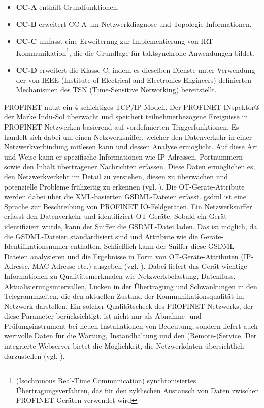 \begin{itemize}
\item \textbf{CC-A} enthält Grundfunktionen.
\item \textbf{CC-B} erweitert CC-A um Netzwerkdiagnose und Topologie-Informationen.
\item \textbf{CC-C} umfasst eine Erweiterung zur Implementierung von IRT-Kommunikation\footnote{(Isochronous Real-Time Communication) synchronisiertes Übertragungsverfahren, das für den zyklischen Austausch von Daten zwischen PROFINET-Geräten verwendet wird}, die die Grundlage für taktsynchrone Anwendungen bildet.
\item \textbf{CC-D} erweitert die Klasse C, indem es dieselben Dienste unter Verwendung der von IEEE (Institute of Electrical and Electronics Engineers) definierten Mechanismen des TSN (Time-Sensitive Networking) bereitstellt.
\end{itemize} PROFINET nutzt ein 4-schichtiges TCP/IP-Modell. Der PROFINET INspektor® der Marke Indu-Sol überwacht und speichert teilnehmerbezogene Ereignisse in PROFINET-Netzwerken basierend auf vordefinierten Triggerfunktionen. Es handelt sich dabei um einen Netzwerksniffer, welcher den Datenverkehr in einer Netzwerkverbindung mitlesen kann und dessen Analyse ermöglicht.  Auf diese Art und Weise kann er spezifische Informationen wie IP-Adressen, Portnummern sowie den Inhalt übertragener Nachrichten erfassen. Diese Daten ermöglichen es, den Netzwerkverkehr im Detail zu verstehen, diesen zu überwachen und potenzielle Probleme frühzeitig zu erkennen (vgl. \cite{luber}). Die OT-Geräte-Attribute werden dabei über die XML-basierten GSDML-Dateien erfasst.  \ac{gsdml} ist eine Sprache zur Beschreibung von PROFINET IO-Feldgeräten. Ein Netzwerksniffer erfasst den Datenverkehr und identifiziert OT-Geräte. Sobald ein Gerät identifiziert wurde, kann der Sniffer die GSDML-Datei laden. Das ist möglich, da die GSDML-Dateien standardisiert sind und Attribute wie die Geräte-Identifikationsnumer enthalten. Schließlich kann der Sniffer diese GSDML-Dateien analysieren und die Ergebnisse in Form von OT-Geräte-Attributen (IP-Adresse, MAC-Adresse etc.) ausgeben (vgl. \cite{SIEMENS}). \clearpage \noindent Dabei liefert das Gerät wichtige Informationen zu Qualitätsmerkmalen wie Netzwerkbelastung, Datenfluss, Aktualisierungsintervallen, Lücken in der Übertragung und Schwankungen in den Telegrammzeiten, die den aktuellen Zustand der Kommunikationsqualität im Netzwerk darstellen. Ein solcher Qualitätscheck des PROFINET-Netzwerks, der diese Parameter berücksichtigt, ist nicht nur als Abnahme- und Prüfungsinstrument bei neuen Installationen von Bedeutung, sondern liefert auch wertvolle Daten für die Wartung, Instandhaltung und den (Remote-)Service. Der integrierte Webserver bietet die Möglichkeit, die Netzwerkdaten übersichtlich darzustellen (vgl. \cite{InduSol}).
